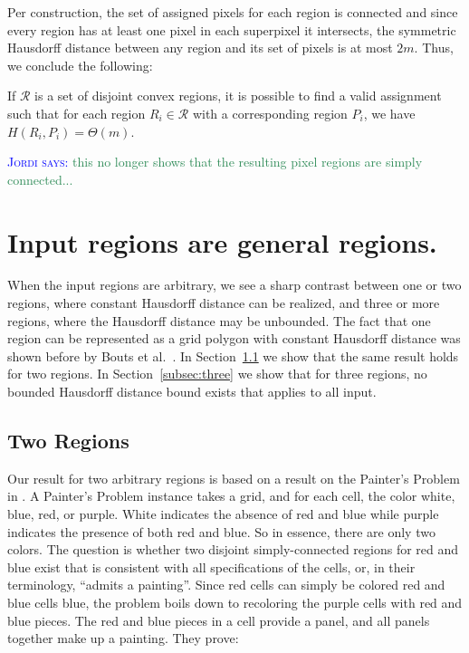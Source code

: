 \documentclass[a4paper,UKenglish,cleveref]{lipics-v2019}
\newcommand{\mremark}[3]{\textcolor{blue}{\textsc{#1 #2:}} \textcolor{SeaGreen}{\textsf{#3}}}
\newcommand{\jordi}[2][says]{\mremark{Jordi}{#1}{#2}}
\newcommand{\etal}{\textnormal{et al.}\xspace}
\begin{document}
Per construction, the set of assigned pixels for each region is connected and since every region has at least one pixel in each superpixel it intersects, the symmetric Hausdorff distance between any region and its set of pixels is at most $2m$. Thus, we conclude the following:

\begin{theorem}
If $\mathcal{R}$ is a set of disjoint convex regions, it is possible to find a valid assignment such that for each region $R_i \in \mathcal{R}$ with a corresponding region $P_i$, we have $H(R_i, P_i) = \Theta(m)$.
\end{theorem}

\jordi{this no longer shows that the resulting pixel regions are simply connected...}

\section{Input regions are general regions.}
\label{sec:general}

When the input regions are arbitrary, we see a sharp contrast between one or two regions, where constant Hausdorff distance can be realized, and three or more regions, where the Hausdorff distance may be unbounded.
The fact that one region can be represented as a grid polygon with constant Hausdorff distance was shown before by Bouts \etal~\cite{bouts2016mapping}. In Section~\ref{subsec:two} we show that the same result holds for two regions. In Section~\ref{subsec:three}
we show that for three regions, no bounded Hausdorff distance bound exists that applies to all input.

\subsection{Two Regions}
\label{subsec:two}

Our result for two arbitrary regions is based on
a result on the Painter's Problem in \cite{goethem2017painter}.
A Painter's Problem instance takes a grid, and for each cell, the color white, blue, red, or purple. White indicates the absence of red and blue while purple indicates the presence of both red and blue. So in
essence, there are only two colors.
The question is whether two disjoint simply-connected regions for red and blue exist that is consistent with all specifications of the
cells, or, in their terminology, ``admits a painting''. Since red cells can simply be colored red and blue cells blue, the problem boils down to recoloring the purple cells with red and blue pieces. The red and blue pieces in a cell provide a panel, and all panels together make up a painting. They prove:
\end{document}
